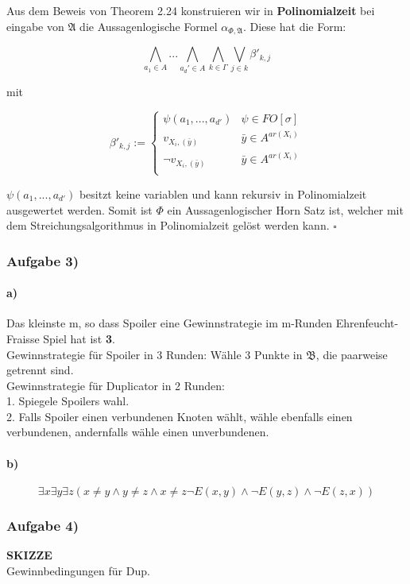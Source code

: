 \documentclass[12pt]{article}
\begin{document}
Aus dem Beweis von Theorem 2.24 konstruieren wir in \textbf{Polinomialzeit} bei eingabe von $\mathfrak{A}$ die Aussagenlogische Formel $\alpha_{\Phi,\mathfrak{A}}$. Diese hat die Form:

\[ \bigwedge_{a_1\in A}... \bigwedge_{a_d'\in A} \bigwedge_{k\in \Gamma} \bigvee_{j\in k} \beta'_{k,j} \] 

mit 

\[ \beta'_{k,j} := 
  \begin{cases}
    \psi(a_1,...,a_{d'}) & \psi\in FO[\sigma]\\
    v_{X_i,(\bar y)} & \bar y \in A^{ar(X_i)} \\
    \neg v_{X_i,(\bar y)} & \bar y \in A^{ar(X_i)} \\
  \end{cases}
\] 

$ \psi(a_1,...,a_{d'}) $ besitzt keine variablen und kann rekursiv in Polinomialzeit ausgewertet werden.
Somit ist $\Phi$ ein Aussagenlogischer Horn Satz ist, welcher mit dem Streichungsalgorithmus in Polinomialzeit gelöst werden kann.
$\square$

\subsubsection*{Aufgabe 3)}
\paragraph{a)}
Das kleinste m, so dass Spoiler eine Gewinnstrategie im m-Runden Ehrenfeucht-Fraisse Spiel hat ist \textbf{3}.\\
Gewinnstrategie für Spoiler in 3 Runden: Wähle 3 Punkte in $\mathfrak{B}$, die paarweise getrennt sind.\\
Gewinnstrategie für Duplicator in 2 Runden: \\
1. Spiegele Spoilers wahl.\\
2. Falls Spoiler einen verbundenen Knoten wählt, wähle ebenfalls einen verbundenen, andernfalls wähle einen unverbundenen.
\paragraph{b)}
\[ \exists x \exists y \exists z ( x\neq y \land y\neq z \land x \neq z \neg E(x,y) \land \neg E(y,z) \land \neg E(z,x) ) \] 

\subsubsection*{Aufgabe 4)}
\textbf{SKIZZE}\\
Gewinnbedingungen für Dup.
\end{document}
